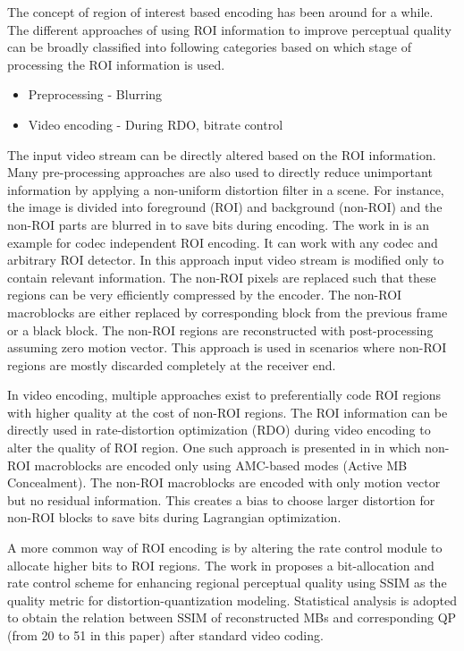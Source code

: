 \documentclass[11pt]{article} %
\begin{document}
The concept of region of interest based encoding has been around for a while. The different approaches of using ROI information to improve perceptual quality can be broadly classified into following categories based on which stage of processing the ROI information is used.
\begin{itemize}  
\item Preprocessing - Blurring
\item Video encoding - During RDO, bitrate control
\end{itemize}
The input video stream can be directly altered based on the ROI information. Many pre-processing approaches are also used to directly reduce unimportant information by applying a non-uniform distortion filter in a scene. For instance, the image is divided into foreground (ROI) and background (non-ROI) and the non-ROI parts are blurred in \cite{ROI-background-blurring} to save bits during encoding. The work in \cite{pre-postprocessig-ROI-codec-independent} is an example for codec independent ROI encoding. It can work with any codec and arbitrary ROI detector. In this approach input video stream is modified only to contain relevant information. The non-ROI pixels are replaced such that these regions can be very efficiently compressed by the encoder. The non-ROI macroblocks are either replaced by corresponding block from the previous frame or a black block. The non-ROI regions are reconstructed with post-processing assuming zero motion vector. This approach is used in scenarios where non-ROI regions are mostly discarded completely at the receiver end.

In video encoding, multiple approaches exist to preferentially code ROI regions with higher quality at the cost of non-ROI regions. The ROI information can be directly used in rate-distortion optimization (RDO) during video encoding to alter the quality of ROI region. One such approach is presented in \cite{ROI-rate-control-H264} in which non-ROI macroblocks are encoded only using AMC-based modes (Active MB Concealment). The non-ROI macroblocks are encoded with only motion vector but no residual information. This creates a bias to choose larger distortion for non-ROI blocks to save bits during Lagrangian optimization.

A more common way of ROI encoding is by altering the rate control module to allocate higher bits to ROI regions. The work in \cite{ROI-bit-allocation-h264} proposes a bit-allocation and rate control scheme for enhancing regional perceptual quality using SSIM as the quality metric for distortion-quantization modeling. Statistical analysis is adopted to obtain the relation between SSIM of reconstructed MBs and corresponding QP (from 20 to 51 in this paper) after standard video coding.
\end{document}
